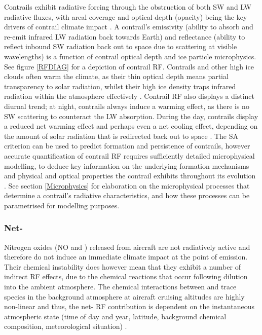 Contrails exhibit radiative forcing through the obstruction of both SW and LW radiative fluxes, with areal coverage and optical depth (opacity) being the key drivers of contrail climate impact \cite{Schumann2017}. A contrail's emissivity (ability to absorb and re-emit infrared LW radiation back towards Earth) and reflectance (ability to reflect inbound SW radiation back out to space due to scattering at visible wavelengths) is a function of contrail optical depth and ice particle microphysics. See figure \ref{RFDIAG} for a depiction of contrail RF. Contrails and other high ice clouds often warm the climate, as their thin optical depth means partial transparency to solar radiation, whilst their high ice density traps infrared radiation within the atmosphere effectively \cite{Karcher2018}. Contrail RF also displays a distinct diurnal trend; at night, contrails always induce a warming effect, as there is no SW scattering to counteract the LW absorption. During the day, contrails display a reduced net warming effect and perhaps even a net cooling effect, depending on the amount of solar radiation that is redirected back out to space \cite{Newinger2012}. The SA criterion can be used to predict formation and persistence of contrails, however accurate quantification of contrail RF requires sufficiently detailed microphysical modelling, to deduce key information on the underlying formation mechanisms and physical and optical properties the contrail exhibits throughout its evolution \cite{Karcher2015}. See section \ref{Microphysics} for elaboration on the microphysical processes that determine a contrail's radiative characteristics, and how these processes can be parametrised for modelling purposes.


\subsubsection{Net-}
Nitrogen oxides (NO and ) released from aircraft are not radiatively active and therefore do not induce an immediate climate impact at the point of emission. Their chemical instability does however mean that they exhibit a number of indirect RF effects, due to the chemical reactions that occur following dilution into the ambient atmosphere. The chemical interactions between  and trace species in the background atmosphere at aircraft cruising altitudes are highly non-linear and thus, the net- RF contribution is dependent on the instantaneous atmospheric state (time of day and year, latitude, background chemical composition, meteorological situation) \cite{Fritz2020, Kraabol2000b}. 

